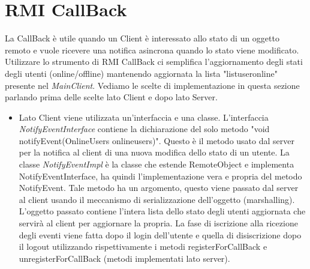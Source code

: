 \documentclass{article} %
\begin{document}
\section{RMI CallBack}
La CallBack è utile quando un Client è interessato allo stato di un oggetto remoto e vuole ricevere una notifica asincrona quando lo stato viene modificato. Utilizzare lo strumento di RMI CallBack ci semplifica l'aggiornamento degli stati degli utenti (online/offline) mantenendo aggiornata la lista "listuseronline" presente nel {\itshape MainClient}. Vediamo le scelte di implementazione in questa sezione parlando prima delle scelte lato Client e dopo lato Server.
\begin{itemize}
    \item Lato Client viene utilizzata un'interfaccia e una classe. L'interfaccia {\itshape NotifyEventInterface} contiene la dichiarazione del solo metodo "void notifyEvent(OnlineUsers onlineusers)". Questo è il metodo usato dal server per la notifica al client di una nuova modifica dello stato di un utente. La classe {\itshape NotifyEventImpl} è la classe che estende RemoteObject e implementa NotifyEventInterface, ha quindi l'implementazione vera e propria del metodo NotifyEvent. Tale metodo ha un argomento, questo viene passato dal server al client usando il meccanismo di serializzazione dell'oggetto (marshalling). L'oggetto passato contiene l'intera lista dello stato degli utenti aggiornata che servirà al client per aggiornare la propria. La fase di iscrizione alla ricezione degli eventi viene fatta dopo il login dell'utente e quella di disiscrizione dopo il logout utilizzando rispettivamente i metodi registerForCallBack e unregisterForCallBack (metodi implementati lato server).

\end{itemize}
\end{document}

